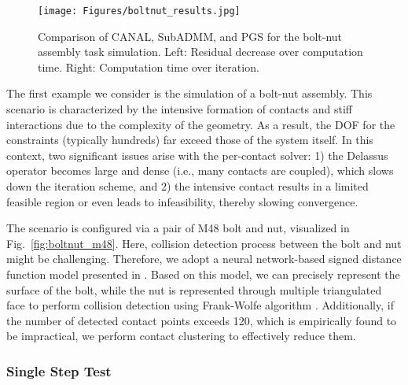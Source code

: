 \documentclass[lettersize,journal]{IEEEtran}
\begin{document}
\begin{figure}[t]
\centering
\texttt{[image: Figures/boltnut\_results.jpg]}
\caption{Comparison of CANAL, SubADMM, and PGS for the bolt-nut assembly task simulation. Left: Residual decrease over computation time. Right: Computation time over iteration.}
\label{fig:boltnut_results}
\end{figure}

The first example we consider is the simulation of a bolt-nut assembly. This scenario is characterized by the intensive formation of contacts and stiff interactions due to the complexity of the geometry. As a result, the DOF for the constraints (typically hundreds) far exceed those of the system itself. 
In this context, two significant issues arise with the per-contact solver: 1) the Delassus operator becomes large and dense (i.e., many contacts are coupled), which slows down the iteration scheme, and 2) the intensive contact results in a limited feasible region or even leads to infeasibility, thereby slowing convergence.

The scenario is configured via a pair of M48 bolt and nut, visualized in Fig.~\ref{fig:boltnut_m48}. 
Here, collision detection process between the bolt and nut might be challenging. Therefore, we adopt a neural network-based signed distance function model presented in \cite{yoon2022fast}. Based on this model, we can precisely represent the surface of the bolt, while the nut is represented through multiple triangulated face to perform collision detection using Frank-Wolfe algorithm \cite{macklin2020local}. Additionally, if the number of detected contact points exceeds 120, which is empirically found to be impractical, we perform contact clustering \cite{jain1999data,yoon2022fast} to effectively reduce them.



\subsubsection{Single Step Test}
\end{document}
